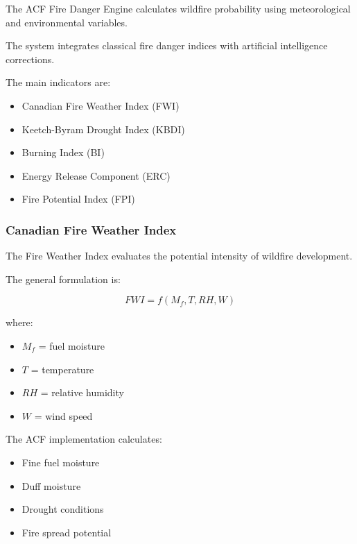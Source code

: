 The ACF Fire Danger Engine calculates wildfire probability using
meteorological and environmental variables.

The system integrates classical fire danger indices with artificial
intelligence corrections.


The main indicators are:

\begin{itemize}

\item Canadian Fire Weather Index (FWI)

\item Keetch-Byram Drought Index (KBDI)

\item Burning Index (BI)

\item Energy Release Component (ERC)

\item Fire Potential Index (FPI)

\end{itemize}



\subsubsection{Canadian Fire Weather Index}

The Fire Weather Index evaluates the potential intensity of wildfire
development.

The general formulation is:

\[
FWI=f(M_f,T,RH,W)
\]


where:

\begin{itemize}

\item $M_f$ = fuel moisture

\item $T$ = temperature

\item $RH$ = relative humidity

\item $W$ = wind speed

\end{itemize}


The ACF implementation calculates:

\begin{itemize}

\item Fine fuel moisture

\item Duff moisture

\item Drought conditions

\item Fire spread potential

\end{itemize}


